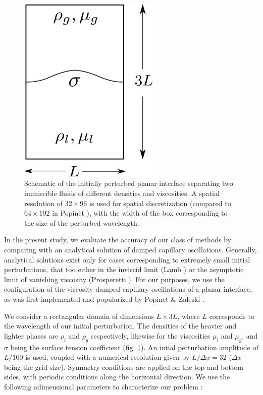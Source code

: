 \begin{figure}[h!]
    \centering
    \includegraphics[width = 0.6\textwidth]{plots/capwave/capwave_conf.png}
	\caption{Schematic of the initially perturbed planar interface separating two immiscible fluids of different densities and viscosities. A spatial resolution of $32 \times 96$ is used for spatial discretization (compared to $64 \times 192$ in Popinet \cite{popinet2009accurate}), with the width of the box corresponding to the size of the perturbed wavelength.}
    \label{capwave_conf}
\end{figure}

In the present study, we evaluate the accuracy of our class of methods by comparing with an analytical solution of damped capillary oscillations. Generally, analytical solutions exist only for cases corresponding to extremely small initial perturbations, that too either in the inviscid limit (Lamb ) or the asymptotic limit of vanishing viscosity (Prosperetti ). For our purposes, we use the configuration of the viscosity-damped capillary oscillations of a planar interface, as was first implemented and popularized by Popinet \& Zaleski \cite{popinet1999front}.  

We consider a rectangular domain of dimensions $L \times 3L$, where $L$ corresponds to the wavelength of our initial perturbation. The densities of the heavier and lighter phases are $\rho_l$ and $\rho_g$ respectively, likewise for the viscosities $\mu_l$ and $\mu_g$, and $\sigma$ being the surface tension coefficient (fig. \ref{capwave_conf}). An intial perturbation amplitude of $L/100$ is used, coupled with a numerical resolution given by $L/\Delta x= 32$ ($\Delta x$ being the grid size). Symmetry conditions are applied on the top and bottom sides, with periodic conditions along the horizontal direction. We use the following adimensional parameters to characterize our problem : 

